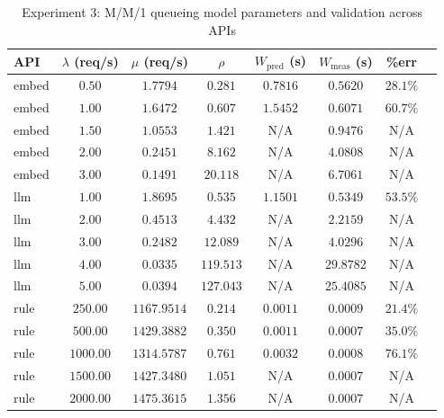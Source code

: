 \begin{table}[htbp]
\centering
\caption{Experiment 3: M/M/1 queueing model parameters and validation across APIs}
\label{tab:long_mm1-metrics}
\begin{tabular}{lccccccc}
\toprule
API & $\lambda$ (req/s) & $\mu$ (req/s) & $\rho$ & $W_{\text{pred}}$ (s) & $W_{\text{meas}}$ (s) & \%err \\
\midrule
embed & $0.50$ & $1.7794$ & $0.281$ & $0.7816$ & $0.5620$ & $28.1\%$ \\
embed & $1.00$ & $1.6472$ & $0.607$ & $1.5452$ & $0.6071$ & $60.7\%$ \\
embed & $1.50$ & $1.0553$ & $1.421$ & N/A & $0.9476$ & N/A \\
embed & $2.00$ & $0.2451$ & $8.162$ & N/A & $4.0808$ & N/A \\
embed & $3.00$ & $0.1491$ & $20.118$ & N/A & $6.7061$ & N/A \\
llm & $1.00$ & $1.8695$ & $0.535$ & $1.1501$ & $0.5349$ & $53.5\%$ \\
llm & $2.00$ & $0.4513$ & $4.432$ & N/A & $2.2159$ & N/A \\
llm & $3.00$ & $0.2482$ & $12.089$ & N/A & $4.0296$ & N/A \\
llm & $4.00$ & $0.0335$ & $119.513$ & N/A & $29.8782$ & N/A \\
llm & $5.00$ & $0.0394$ & $127.043$ & N/A & $25.4085$ & N/A \\
rule & $250.00$ & $1167.9514$ & $0.214$ & $0.0011$ & $0.0009$ & $21.4\%$ \\
rule & $500.00$ & $1429.3882$ & $0.350$ & $0.0011$ & $0.0007$ & $35.0\%$ \\
rule & $1000.00$ & $1314.5787$ & $0.761$ & $0.0032$ & $0.0008$ & $76.1\%$ \\
rule & $1500.00$ & $1427.3480$ & $1.051$ & N/A & $0.0007$ & N/A \\
rule & $2000.00$ & $1475.3615$ & $1.356$ & N/A & $0.0007$ & N/A \\
\bottomrule
\end{tabular}
\end{table}
